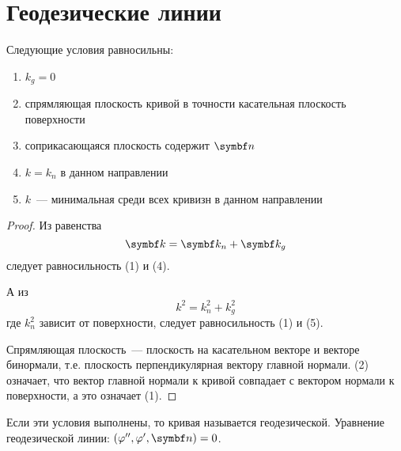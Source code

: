 \documentclass[main]{subfiles}
\begin{document}
\chapter{Геодезические линии}
\begin{theorem}
    Следующие условия равносильны:
    \begin{enumerate}
        \item $k_g = 0$
        \item спрямляющая плоскость кривой в точности касательная плоскость поверхности
        \item соприкасающаяся плоскость содержит $\vn$
        \item $k = k_n$ в данном направлении
        \item $k$~--- минимальная среди всех кривизн в данном направлении
    \end{enumerate}
\end{theorem}
\begin{proof}
    Из равенства
    \[\vk = \vk_n + \vk_g\]
    следует равносильность (1) и (4).

    А из
    \[k^2 = k^2_n + k^2_g\]
    где $k^2_n$ зависит от поверхности, следует равносильность (1) и (5).

    Спрямляющая плоскость~--- плоскость на касательном векторе и векторе бинормали,
    т.е. плоскость перпендикулярная вектору главной нормали.
    (2) означает, что вектор главной нормали к кривой совпадает с вектором нормали к поверхности, а это означает (1).
\end{proof}
\begin{definition}
    Если эти условия выполнены, то кривая называется геодезической.
    Уравнение геодезической линии: $(\phi'', \phi', \vn) = 0$.
\end{definition}
\end{document}

